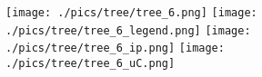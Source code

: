 \documentclass{standalone}
\begin{document}
  \begin{minipage}[t]{\textwidth}

  \begin{figure}
      \centering
      \texttt{[image: ./pics/tree/tree\_6.png]}
      \qquad
      \texttt{[image: ./pics/tree/tree\_6\_legend.png]}
      \vfill
      \texttt{[image: ./pics/tree/tree\_6\_ip.png]}
      \qquad
      \texttt{[image: ./pics/tree/tree\_6\_uC.png]}
  \end{figure}

  \end{minipage}
\end{document}

